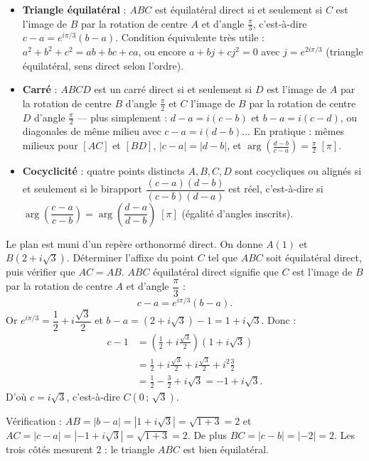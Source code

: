 \documentclass[11pt]{article}
\begin{document}
\begin{itemize}
\item \textbf{Triangle équilatéral} : $ABC$ est équilatéral direct si et seulement si $C$ est l'image de $B$ par la rotation de centre $A$ et d'angle $\frac{\pi}{3}$, c'est-à-dire $c - a = e^{i\pi/3}(b - a)$. Condition équivalente très utile : $a^2 + b^2 + c^2 = ab + bc + ca$, ou encore $a + bj + cj^2 = 0$ avec $j = e^{2i\pi/3}$ (triangle équilatéral, sens direct selon l'ordre).
\item \textbf{Carré} : $ABCD$ est un carré direct si et seulement si $D$ est l'image de $A$ par la rotation de centre $B$ d'angle $\frac{\pi}{2}$ et $C$ l'image de $B$ par la rotation de centre $D$ d'angle $\frac{\pi}{2}$ — plus simplement : $d - a = i(c - b)$ et $b - a = i(c - d)$, ou diagonales de même milieu avec $c - a = i(d - b)$... En pratique : mêmes milieux pour $[AC]$ et $[BD]$, $|c - a| = |d - b|$, et $\arg\left(\frac{d-b}{c-a}\right) = \frac{\pi}{2}\;[\pi]$.
\item \textbf{Cocyclicité} : quatre points distincts $A, B, C, D$ sont cocycliques ou alignés si et seulement si le birapport $\dfrac{(c-a)(d-b)}{(c-b)(d-a)}$ est réel, c'est-à-dire si $\arg\left(\dfrac{c-a}{c-b}\right) = \arg\left(\dfrac{d-a}{d-b}\right)\;[\pi]$ (égalité d'angles inscrits).
\end{itemize}

\begin{exoresolu}
Le plan est muni d'un repère orthonormé direct. On donne $A(1)$ et $B(2 + i\sqrt{3})$. Déterminer l'affixe du point $C$ tel que $ABC$ soit équilatéral direct, puis vérifier que $AC = AB$.
\tcblower
$ABC$ équilatéral direct signifie que $C$ est l'image de $B$ par la rotation de centre $A$ et d'angle $\dfrac{\pi}{3}$ :
\[
c - a = e^{i\pi/3}(b - a).
\]
Or $e^{i\pi/3} = \dfrac{1}{2} + i\dfrac{\sqrt{3}}{2}$ et $b - a = (2 + i\sqrt{3}) - 1 = 1 + i\sqrt{3}$. Donc :
\begin{align*}
c - 1 &= \left(\frac{1}{2} + i\frac{\sqrt{3}}{2}\right)\left(1 + i\sqrt{3}\right) \\
&= \frac{1}{2} + i\frac{\sqrt{3}}{2} + i\frac{\sqrt{3}}{2} + i^2\frac{3}{2} \\
&= \frac{1}{2} - \frac{3}{2} + i\sqrt{3} = -1 + i\sqrt{3}.
\end{align*}
D'où $c = i\sqrt{3}$, c'est-à-dire $C(0\,;\,\sqrt{3})$.
\medskip

Vérification : $AB = |b - a| = |1 + i\sqrt{3}| = \sqrt{1 + 3} = 2$ et $AC = |c - a| = |{-1} + i\sqrt{3}| = \sqrt{1 + 3} = 2$. De plus $BC = |c - b| = |{-2}| = 2$. Les trois côtés mesurent $2$ : le triangle $ABC$ est bien équilatéral.
\end{exoresolu}
\end{document}
